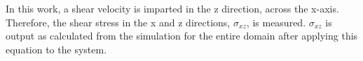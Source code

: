 In this work, a shear velocity is imparted in the z direction, across the x-axis. Therefore, the shear stress in the x 
and z directions, $\sigma_{xz}$, is measured. $\sigma_{xz}$ is output as calculated from the simulation for the entire 
domain after applying this equation to the system. 







